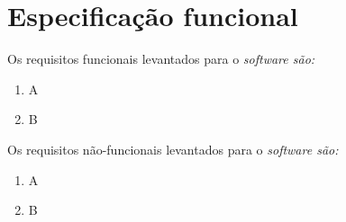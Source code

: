 
\section{Especificação funcional}

Os requisitos funcionais levantados para o \it{software} são:

\begin{enumerate}[label=RF \arabic* -- , ref=\arabic*]
	\item A
	\item B
\end{enumerate}

Os requisitos não-funcionais levantados para o \it{software} são:

\begin{enumerate}[label=RNF \arabic* -- , ref=\arabic*]
	\item A
	\item B
\end{enumerate}